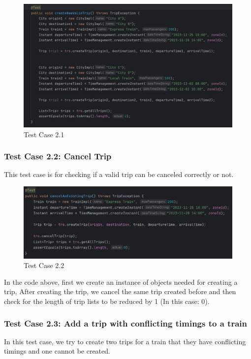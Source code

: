 \documentclass{article}
\begin{document}
\begin{figure}[h]
  \centering
  \includegraphics[width=1.0\textwidth]{pictures/T2-1.png}
  \caption{Test Case 2.1}
  \label{fig:your_label}
\end{figure}

\pagebreak

\subsubsection{Test Case 2.2: Cancel Trip}
This test case is for checking if a valid trip can be canceled correctly or not.

\begin{figure}[h]
  \centering
  \includegraphics[width=1.0\textwidth]{pictures/T2-2.png}
  \caption{Test Case 2.2}
  \label{fig:your_label}
\end{figure}

In the code above, first we create an instance of objects needed for creating a trip, After creating the trip, we cancel the same trip created before and then check for the length of trip lists to be reduced by 1 (In this case: 0).



\subsubsection{Test Case 2.3: Add a trip with conflicting timings to a train}
In this test case, we try to create two trips for a train that they have conflicting timings and one cannot be created.
\end{document}
